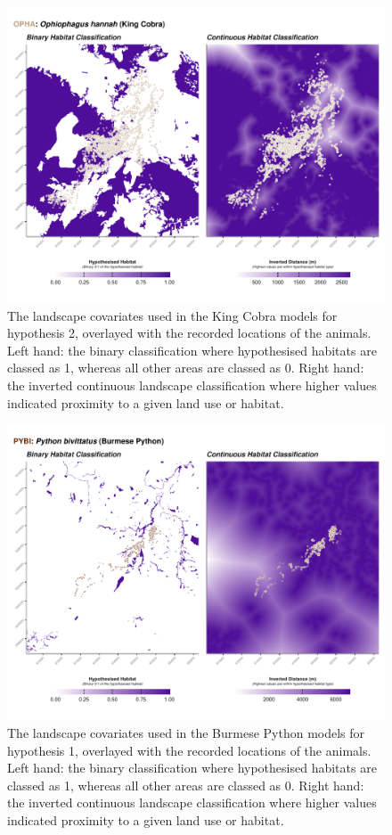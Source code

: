 \documentclass[10pt,a4paper]{article}
\begin{document}
\begin{figure}
\includegraphics[width=1\linewidth]{../../figures/landscape_plot_OPHA_H2} \caption{The landscape covariates used in the King Cobra models for hypothesis 2, overlayed with the recorded locations of the animals. Left hand: the binary classification where hypothesised habitats are classed as 1, whereas all other areas are classed as 0. Right hand: the inverted continuous landscape classification where higher values indicated proximity to a given land use or habitat.}\label{fig:landscapePlotOPHA2}
\end{figure}

\begin{figure}
\includegraphics[width=1\linewidth]{../../figures/landscape_plot_PYBI_H1} \caption{The landscape covariates used in the Burmese Python models for hypothesis 1, overlayed with the recorded locations of the animals. Left hand: the binary classification where hypothesised habitats are classed as 1, whereas all other areas are classed as 0. Right hand: the inverted continuous landscape classification where higher values indicated proximity to a given land use or habitat.}\label{fig:landscapePlotPYBI1}
\end{figure}
\end{document}
